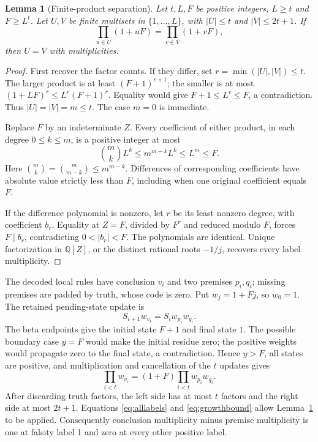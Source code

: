 \documentclass[11pt,a4paper]{article}
\newtheorem{lemma}[theorem]{Lemma}
\theoremstyle{definition}
\begin{document}
\begin{lemma}[Finite-product separation]\label{lem:separation}
Let $t,L,F$ be positive integers, $L\ge t$ and $F\ge L^t$.
Let $U,V$ be finite multisets in $\{1,\ldots,L\}$, with $|U|\le t$
and $|V|\le2t+1$. If
\[
 \prod_{u\in U}(1+uF)=\prod_{v\in V}(1+vF),
\]
then $U=V$ with multiplicities.
\end{lemma}
\begin{proof}
First recover the factor counts. If they differ, set
$r=\min(|U|,|V|)\le t$. The larger product is at least $(F+1)^{r+1}$;
the smaller is at most $(1+LF)^r\le L^r(F+1)^r$. Equality would give
$F+1\le L^r\le F$, a contradiction. Thus $|U|=|V|=m\le t$.
The case $m=0$ is immediate.

Replace $F$ by an indeterminate $Z$. Every coefficient of either product,
in each degree $0\le k\le m$, is a positive integer at most
\[
 \binom{m}{k}L^k\le m^{m-k}L^k\le L^m\le F.
\]
Here $\binom{m}{k}=\binom{m}{m-k}\le m^{m-k}$. Differences of corresponding
coefficients have absolute value strictly less than $F$, including when
one original coefficient equals $F$.

If the difference polynomial is nonzero, let $r$ be its least nonzero
degree, with coefficient $b_r$. Equality at $Z=F$, divided by $F^r$ and
reduced modulo $F$, forces $F\mid b_r$, contradicting $0<|b_r|<F$.
The polynomials are identical. Unique factorization in $\mathbb Q[Z]$,
or the distinct rational roots $-1/j$, recovers every label multiplicity.
\end{proof}

The decoded local rules have conclusion $v_i$ and two premises $p_i,q_i$;
missing premises are padded by truth, whose code is zero. Put $w_j=1+Fj$,
so $w_0=1$. The retained pending-state update is
\[
 S_{i+1}w_{v_i}=S_iw_{p_i}w_{q_i}.
\]
The beta endpoints give the initial state $F+1$ and final state $1$.
The possible boundary case $y=F$ would make the initial residue zero;
the positive weights would propagate zero to the final state, a
contradiction. Hence $y>F$, all states are positive, and multiplication
and cancellation of the $t$ updates gives
\begin{equation}\label{eq:balance}
 \prod_{i<t}w_{v_i}=(1+F)\prod_{i<t}w_{p_i}w_{q_i}.
\end{equation}
After discarding truth factors, the left side has at most $t$ factors
and the right side at most $2t+1$. Equations \eqref{eq:alllabels} and
\eqref{eq:growthbound} allow Lemma~\ref{lem:separation} to be applied.
Consequently conclusion multiplicity minus premise multiplicity is
one at falsity label 1 and zero at every other positive label.
\end{document}
